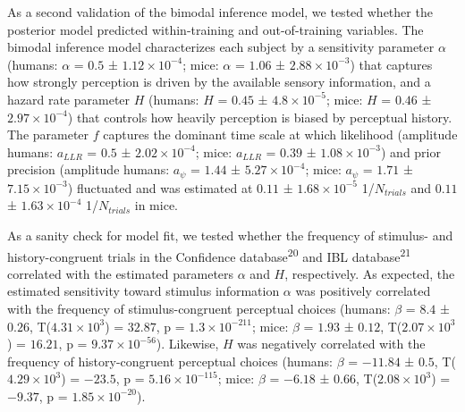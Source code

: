 \documentclass[
]{article}
\begin{document}
As a second validation of the bimodal inference model, we tested whether
the posterior model predicted within-training and out-of-training
variables. The bimodal inference model characterizes each subject by a
sensitivity parameter \(\alpha\) (humans: \(\alpha\) = \(0.5\) ±
\(\ensuremath{1.12\times 10^{-4}}\); mice: \(\alpha\) = \(1.06\) ±
\(\ensuremath{2.88\times 10^{-3}}\)) that captures how strongly
perception is driven by the available sensory information, and a hazard
rate parameter \(H\) (humans: \(H\) = \(0.45\) ±
\(\ensuremath{4.8\times 10^{-5}}\); mice: \(H\) = \(0.46\) ±
\(\ensuremath{2.97\times 10^{-4}}\)) that controls how heavily
perception is biased by perceptual history. The parameter \(f\) captures
the dominant time scale at which likelihood (amplitude humans:
\(a_{LLR}\) = \(0.5\) ± \(\ensuremath{2.02\times 10^{-4}}\); mice:
\(a_{LLR}\) = \(0.39\) ± \(\ensuremath{1.08\times 10^{-3}}\)) and prior
precision (amplitude humans: \(a_{\psi}\) = \(1.44\) ±
\(\ensuremath{5.27\times 10^{-4}}\); mice: \(a_{\psi}\) = \(1.71\) ±
\(\ensuremath{7.15\times 10^{-3}}\)) fluctuated and was estimated at
\(0.11\) ± \(\ensuremath{1.68\times 10^{-5}}\) 1/\(N_{trials}\) and
\(0.11\) ± \(\ensuremath{1.63\times 10^{-4}}\) 1/\(N_{trials}\) in mice.

As a sanity check for model fit, we tested whether the frequency of
stimulus- and history-congruent trials in the Confidence
database\textsuperscript{20} and IBL database\textsuperscript{21}
correlated with the estimated parameters \(\alpha\) and \(H\),
respectively. As expected, the estimated sensitivity toward stimulus
information \(\alpha\) was positively correlated with the frequency of
stimulus-congruent perceptual choices (humans: \(\beta\) = \(8.4\) ±
\(0.26\), T(\(\ensuremath{4.31\times 10^{3}}\)) = \(32.87\), p =
\(\ensuremath{1.3\times 10^{-211}}\); mice: \(\beta\) = \(1.93\) ±
\(0.12\), T(\(\ensuremath{2.07\times 10^{3}}\)) = \(16.21\), p =
\(\ensuremath{9.37\times 10^{-56}}\)). Likewise, \(H\) was negatively
correlated with the frequency of history-congruent perceptual choices
(humans: \(\beta\) = \(-11.84\) ± \(0.5\),
T(\(\ensuremath{4.29\times 10^{3}}\)) = \(-23.5\), p =
\(\ensuremath{5.16\times 10^{-115}}\); mice: \(\beta\) = \(-6.18\) ±
\(0.66\), T(\(\ensuremath{2.08\times 10^{3}}\)) = \(-9.37\), p =
\(\ensuremath{1.85\times 10^{-20}}\)).
\end{document}
